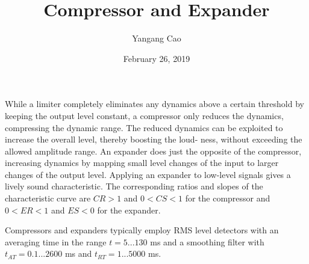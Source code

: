 \documentclass[10pt,a4paper,oneside]{article}
\author{Yangang Cao}
\date{February 26, 2019}
\begin{document}
\title{Compressor and Expander}
\maketitle 
While a limiter completely eliminates any dynamics above a certain threshold by keeping the output level constant, a compressor only reduces the dynamics, compressing the dynamic range. The reduced dynamics can be exploited to increase the overall level, thereby boosting the loud- ness, without exceeding the allowed amplitude range. An expander does just the opposite of the compressor, increasing dynamics by mapping small level changes of the input to larger changes of the output level. Applying an expander to low-level signals gives a lively sound characteristic. The corresponding ratios and slopes of the characteristic curve are $CR > 1$ and $0 < CS < 1$ for the compressor and $0 < ER < 1$ and $ES < 0$ for the expander.

Compressors and expanders typically employ RMS level detectors with an averaging time in the range $t = 5...130$ ms and a smoothing filter with $t_{AT} = 0.1...2600$ ms and $t_{RT} = 1...5000$ ms. 
\end{document}
